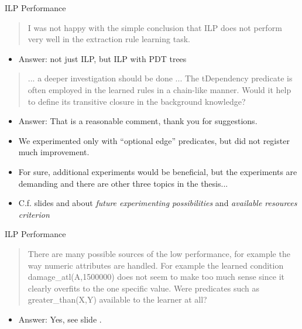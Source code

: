 \documentclass[xcolor=dvipsnames]{beamer}
\begin{document}
\begin{frame}{ILP Performance}
\begin{quotation}
I was not happy with the simple conclusion that ILP does not perform very well in the extraction rule
learning task.
\end{quotation}
\begin{itemize}
	\item Answer: not just ILP, but ILP with PDT trees
\end{itemize}

\begin{quotation}
... a deeper investigation should be done ... The tDependency predicate is
often employed in the learned rules in a chain-like manner. Would it help to define its transitive
closure in the background knowledge?
\end{quotation}
\begin{itemize}
	\item Answer: That is a reasonable comment, thank you for suggestions. 
	\item We experimented only with ``optional edge'' predicates, but did not register much improvement.
	\item For sure, additional experiments would be beneficial, but the experiments are demanding and there are other three topics in the thesis... 
	\item C.f. slides \pageref{future_experiments} and \pageref{resources} about \emph{future experimenting possibilities} and \emph{available resources criterion} 
\end{itemize}
\end{frame}

\begin{frame}{ILP Performance}
\begin{quotation}
There are many possible sources of the low performance, for example the
way numeric attributes are handled. For example the learned condition damage\_atl(A,1500000)
does not seem to make too much sense since it clearly overfits to the one specific value.
Were predicates such as greater\_than(X,Y) available to the learner at all?
\end{quotation}
\begin{itemize}
	\item Answer: Yes, see slide \pageref{monotonization}.
\end{itemize}
\end{frame}
\resetcolor
\end{document}
